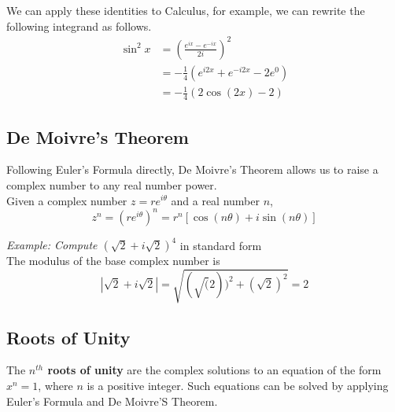 \documentclass{article}
\begin{document}
            \noindent We can apply these identities to Calculus, for example, we can rewrite the
            following integrand as follows. \\
            \begin{align*}
                \sin^2{x} &= \left(\frac{e^{ix}-e^{-ix}}{2i}\right)^2 \\
                &= -\frac{1}{4}(e^{i2x}+e^{-i2x}-2e^0) \\
                &= -\frac{1}{4}(2\cos{(2x)}-2)
            \end{align*}


        \subsection{De Moivre's Theorem}

            Following Euler's Formula directly, De Moivre's Theorem allows us to raise a complex number
            to any real number power. \\

            \noindent Given a complex number $z=re^{i\theta}$ and a real number $n$, \\
            \begin{equation*}
                z^n = (re^{i\theta})^n=r^n[\cos{(n\theta)}+i\sin{(n\theta)}]
            \end{equation*}

            \noindent \textit{Example: Compute $(\sqrt{2}+i\sqrt{2})^4$} in standard form \\
            The modulus of the base complex number is \\
            \begin{equation*}
                |\sqrt{2}+i\sqrt{2}| = \sqrt{(\sqrt(2))^2+(\sqrt{2})^2} = 2
            \end{equation*}



            \subsection{Roots of Unity}

            The \textbf{$n^{th}$ roots of unity} are the complex solutions to an equation of the form
            $x^n=1$, where $n$ is a positive integer. Such equations can be solved by applying
            Euler's Formula and De Moivre'S Theorem. \\
\end{document}
